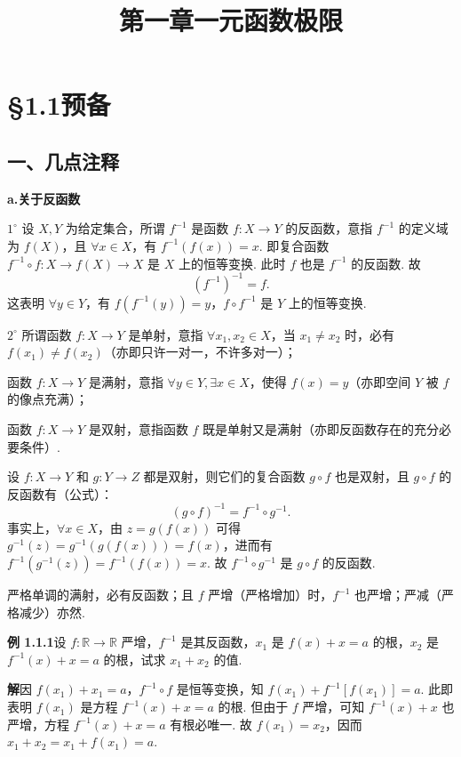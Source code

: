 \documentclass[UTF8,12pt,a4paper,fontset=fandol]{ctexart}
\title{第一章\quad 一元函数极限}
\author{}
\date{}
\begin{document}
\maketitle

\section*{§1.1\quad 预备}

\subsection*{一、几点注释}

\noindent\textbf{a.\quad 关于反函数}

$1^\circ$ 设 $X,Y$ 为给定集合，所谓 $f^{-1}$ 是函数 $f:X\to Y$ 的反函数，意指 $f^{-1}$ 的定义域为 $f(X)$，且 $\forall x\in X$，有 $f^{-1}(f(x))=x$. 即复合函数 $f^{-1}\circ f:X\to f(X)\to X$ 是 $X$ 上的恒等变换. 此时 $f$ 也是 $f^{-1}$ 的反函数. 故
\[
  (f^{-1})^{-1}=f.
\tag{A}
\]
这表明 $\forall y\in Y$，有 $f(f^{-1}(y))=y$，$f\circ f^{-1}$ 是 $Y$ 上的恒等变换.

$2^\circ$ 所谓函数 $f:X\to Y$ 是单射，意指 $\forall x_1,x_2\in X$，当 $x_1\ne x_2$ 时，必有 $f(x_1)\ne f(x_2)$（亦即只许一对一，不许多对一）；

函数 $f:X\to Y$ 是满射，意指 $\forall y\in Y,\exists x\in X$，使得 $f(x)=y$（亦即空间 $Y$ 被 $f$ 的像点充满）；

函数 $f:X\to Y$ 是双射，意指函数 $f$ 既是单射又是满射（亦即反函数存在的充分必要条件）.

设 $f:X\to Y$ 和 $g:Y\to Z$ 都是双射，则它们的复合函数 $g\circ f$ 也是双射，且 $g\circ f$ 的反函数有（公式）：
\[
  (g\circ f)^{-1}=f^{-1}\circ g^{-1}.
\tag{B}
\]
事实上，$\forall x\in X$，由 $z=g(f(x))$ 可得 $g^{-1}(z)=g^{-1}(g(f(x)))=f(x)$，进而有 $f^{-1}(g^{-1}(z))=f^{-1}(f(x))=x$. 故 $f^{-1}\circ g^{-1}$ 是 $g\circ f$ 的反函数.

严格单调的满射，必有反函数；且 $f$ 严增（严格增加）时，$f^{-1}$ 也严增；严减（严格减少）亦然.

\noindent\textbf{例 1.1.1}\quad 设 $f:\mathbb{R}\to\mathbb{R}$ 严增，$f^{-1}$ 是其反函数，$x_1$ 是 $f(x)+x=a$ 的根，$x_2$ 是 $f^{-1}(x)+x=a$ 的根，试求 $x_1+x_2$ 的值.

\noindent\textbf{解}\quad 因 $f(x_1)+x_1=a$，$f^{-1}\circ f$ 是恒等变换，知 $f(x_1)+f^{-1}[f(x_1)]=a$. 此即表明 $f(x_1)$ 是方程 $f^{-1}(x)+x=a$ 的根. 但由于 $f$ 严增，可知 $f^{-1}(x)+x$ 也严增，方程 $f^{-1}(x)+x=a$ 有根必唯一. 故 $f(x_1)=x_2$，因而 $x_1+x_2=x_1+f(x_1)=a$.
\end{document}
